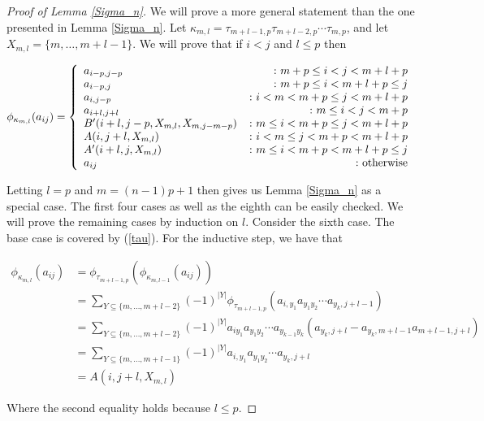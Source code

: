\documentclass[11pt]{amsart}
\def\t{{\tau}}
\def\k{{\kappa}}
\theoremstyle{definition}
\begin{document}
\begin{proof} [Proof of Lemma \ref{Sigma_n}]

We will prove a more general statement than the one presented in Lemma \ref{Sigma_n}.  Let $\kappa_{m,l} = \t_{m+l-1,p}\t_{m+l-2,p}\cdots\t_{m,p}$, and let $X_{m,l} = \{m,\ldots,m+l-1\}$.  We will prove that if $i<j$ and $l\le p$ then

$$
\phi_{\kappa_{m,l}}(a_{ij}) =
\left\{
     \begin{array}{lr}
       a_{i-p,j-p} & \colon m+p\le i<j< m+l+p\\
       a_{i-p,j} &\colon m+p\le i< m+l+p\le j\\
       a_{i,j-p} & \colon i<m<m+p\le j<m+l+p\\
       a_{i+l,j+l} &\colon m\le i<j<m+p\\
       B'(i+l,j-p,X_{m,l},X_{m,j-m-p}) & \colon m\le i<m+p\le j <m+l+p\\
       A(i,j+l,X_{m,l}) & \colon i<m\le j <m+p<m+l+p\\
       A'(i+l,j,X_{m,l}) & \colon m\le i <m+p<m+l+p\le j\\
       a_{ij} & \colon \textnormal{otherwise}
     \end{array}
\right.
$$


Letting $l=p$ and $m=(n-1)p+1$ then gives us Lemma \ref{Sigma_n} as a special case.  The first four cases  as well as the eighth can be easily checked.  We will prove the remaining cases by induction on $l$.  Consider the sixth case.  The base case is covered by (\ref{tau}).  For the inductive step, we have that

\begin{align*}
\phi_{\k_{m,l}}(a_{ij}) &= \phi_{\t_{m+l-1,p}}\left(\phi_{\k_{m,l-1}}(a_{ij})\right)\\
&= \sum_{Y\subseteq \{m,\ldots,m+l-2\}} (-1)^{|Y|} \phi_{\t_{m+l-1,p}}\left(a_{i,y_1}a_{y_1y_2}\cdots a_{y_k,j+l-1}\right)\\
&= \sum_{Y\subseteq \{m,\ldots,m+l-2\}} (-1)^{|Y|} a_{iy_1}a_{y_1y_2}\cdots a_{y_{k-1}y_k}\left(a_{y_k,j+l}-a_{y_k,m+l-1}a_{m+l-1,j+l}\right)\\
&= \sum_{Y\subseteq \{m,\ldots,m+l-1\}} (-1)^{|Y|} a_{i,y_1}a_{y_1y_2}\cdots a_{y_k,j+l}\\
&= A(i,j+l,X_{m,l})
\end{align*}

Where the second equality holds because $l\le p$.


\end{proof}
\end{document}
